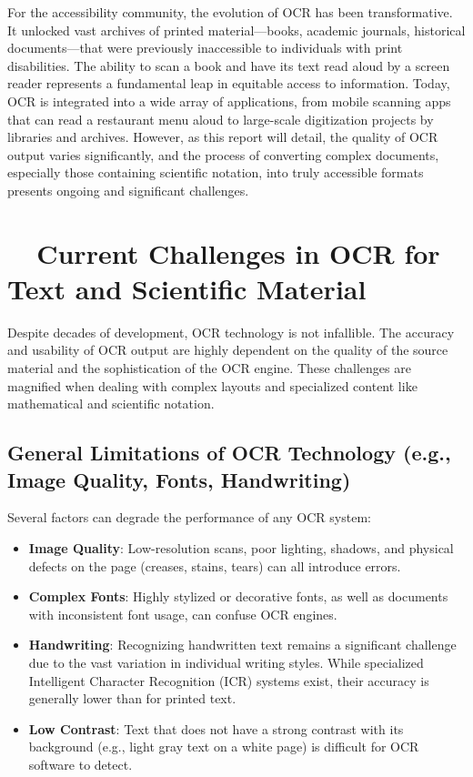 For the accessibility community, the evolution of OCR has been transformative. It unlocked vast archives of printed material—books, academic journals, historical documents—that were previously inaccessible to individuals with print disabilities. The ability to scan a book and have its text read aloud by a screen reader represents a fundamental leap in equitable access to information. Today, OCR is integrated into a wide array of applications, from mobile scanning apps that can read a restaurant menu aloud to large-scale digitization projects by libraries and archives. However, as this report will detail, the quality of OCR output varies significantly, and the process of converting complex documents, especially those containing scientific notation, into truly accessible formats presents ongoing and significant challenges.

\section{~~Current Challenges in OCR for Text and Scientific Material}
\label{sec:ocr-challenges}
Despite decades of development, OCR technology is not infallible. The accuracy and usability of OCR output are highly dependent on the quality of the source material and the sophistication of the OCR engine. These challenges are magnified when dealing with complex layouts and specialized content like mathematical and scientific notation.

\subsection{General Limitations of OCR Technology (e.g., Image Quality, Fonts, Handwriting)}
\label{subsec:ocr-general-limitations}
Several factors can degrade the performance of any OCR system:
\begin{itemize}
	\item \textbf{Image Quality}: Low-resolution scans, poor lighting, shadows, and physical defects on the page (creases, stains, tears) can all introduce errors.
	\item \textbf{Complex Fonts}: Highly stylized or decorative fonts, as well as documents with inconsistent font usage, can confuse OCR engines.
	\item \textbf{Handwriting}: Recognizing handwritten text remains a significant challenge due to the vast variation in individual writing styles. While specialized Intelligent Character Recognition (ICR) systems exist, their accuracy is generally lower than for printed text.
	\item \textbf{Low Contrast}: Text that does not have a strong contrast with its background (e.g., light gray text on a white page) is difficult for OCR software to detect.
\end{itemize}

